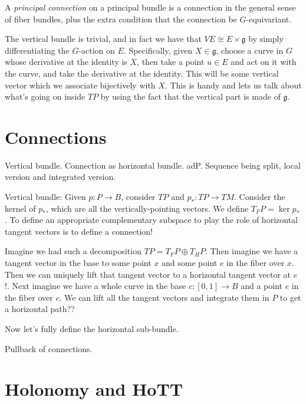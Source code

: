 \documentclass[12pt]{article}
\begin{document}
A \emph{principal connection} on a principal bundle is a connection in the general sense of fiber bundles, plus the extra condition that the connection be $G$-equivariant. 

The vertical bundle is trivial, and in fact we have that $VE\cong E\times\mathfrak{g}$ by simply differentiating the $G$-action on $E$. Specifically, given $X\in \mathfrak{g}$, choose a curve in $G$ whose derivative at the identity is $X$, then take a point $u\in E$ and act on it with the curve, and take the derivative at the identity. This will be some vertical vector which we associate bijectively with $X$. This is handy and lets us talk about what's going on inside $TP$ by using the fact that the vertical part is made of $\mathfrak{g}$.



\section{Connections}
Vertical bundle. Connection as horizontal bundle. adP. Sequence being split, local version and integrated version.

Vertical bundle: Given $p:P\to B$, consider $TP$ and $p_*:TP\to TM$. Consider the kernel of $p_*$, which are all the vertically-pointing vectors. We define $T_F P = \ker p_*$. To define an appropriate complementary subspace to play the role of horizontal tangent vectors is to define a connection! 

Imagine we had such a decomposition $TP=T_FP \oplus T_HP$. Then imagine we have a tangent vector in the base to some point $x$ and some point $e$ in the fiber over $x$. Then we can uniquely lift that tangent vector to a horizontal tangent vector at $e$!. Next imagine we have a whole curve in the base $c:[0,1]\to B$ and a point $e$ in the fiber over $c$. We can lift all the tangent vectors and integrate them in $P$ to get a horizontal path??

Now let's fully define the horizontal sub-bundle.

Pullback of connections.
\section{Holonomy and HoTT}


\end{document}
